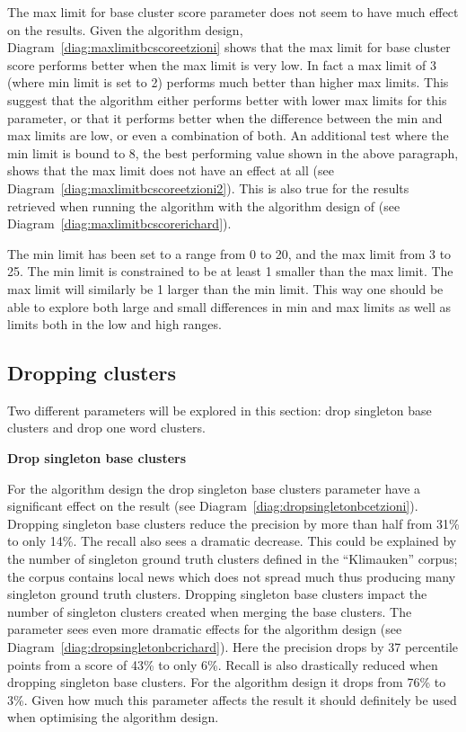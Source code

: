 The max limit for base cluster score parameter does not seem to have much effect on the results. Given the \citeauthor{Oren1998} algorithm design, Diagram~\ref{diag:maxlimitbcscoreetzioni} shows that the max limit for base cluster score performs better when the max limit is very low. In fact a max limit of 3 (where min limit is set to 2) performs much better than higher max limits. This suggest that the algorithm either performs better with lower max limits for this parameter, or that it performs better when the difference between the min and max limits are low, or even a combination of both. An additional test where the min limit is bound to 8, the best performing value shown in the above paragraph, shows that the max limit does not have an effect at all (see Diagram~\ref{diag:maxlimitbcscoreetzioni2}). This is also true for the results retrieved when running the \CTC algorithm with the algorithm design of \citeauthor{Moe2013compact} (see Diagram~\ref{diag:maxlimitbcscorerichard}).

The min limit has been set to a range from 0 to 20, and the max limit from 3 to 25. The min limit is constrained to be at least 1 smaller than the max limit. The max limit will similarly be 1 larger than the min limit. This way one should be able to explore both large and small differences in min and max limits as well as limits both in the low and high ranges.

\subsection{Dropping clusters}
Two different parameters will be explored in this section: drop singleton base clusters and drop one word clusters.

\textbf{Drop singleton base clusters}

For the \citeauthor{Oren1998} algorithm design the drop singleton base clusters parameter have a significant effect on the result (see Diagram~\ref{diag:dropsingletonbcetzioni}). Dropping singleton base clusters reduce the precision by more than half from 31\% to only 14\%. The recall also sees a dramatic decrease. This could be explained by the number of singleton ground truth clusters defined in the ``Klimauken'' corpus; the corpus contains local news which does not spread much thus producing many singleton ground truth clusters. Dropping singleton base clusters impact the number of singleton clusters created when merging the base clusters. The parameter sees even more dramatic effects for the \citeauthor{Moe2013compact} algorithm design (see Diagram~\ref{diag:dropsingletonbcrichard}). Here the precision drops by 37 percentile points from a score of 43\% to only 6\%. Recall is also drastically reduced when dropping singleton base clusters. For the \citeauthor{Moe2013compact} algorithm design it drops from 76\% to 3\%. Given how much this parameter affects the result it should definitely be used when optimising the algorithm design.

